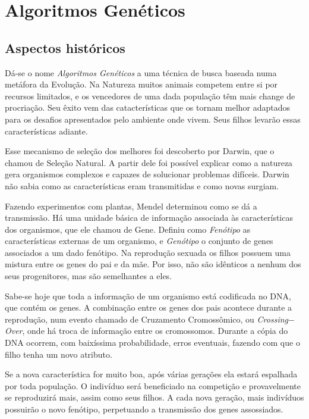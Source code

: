 \chapter{Algoritmos Genéticos\label{cap:ga}}

\section{Aspectos históricos}

Dá-se o nome \emph{Algoritmos Genéticos} a uma técnica de busca baseada numa metáfora da Evolução. Na Natureza muitos animais competem entre si por recursos limitados, e os vencedores de uma dada população têm mais change de procriação. Seu êxito vem das catacterísticas que os tornam melhor adaptados para os desafios apresentados pelo ambiente onde vivem. Seus filhos levarão essas características adiante. 

Esse mecanismo de seleção dos melhores foi descoberto por Darwin, que o chamou de Seleção Natural. A partir dele foi possível explicar como a natureza gera organismos complexos e capazes de solucionar problemas difíceis. Darwin não sabia como as características eram transmitidas e como novas surgiam.

Fazendo experimentos com plantas, Mendel determinou como se dá a transmissão. Há uma unidade básica de informação associada às características dos organismos, que ele chamou de Gene. Definiu como \emph{Fenótipo} as características externas de um organismo, e \emph{Genótipo} o conjunto de genes associados a um dado fenótipo. Na reprodução sexuada os filhos possuem uma mistura entre os genes do pai e da mãe. Por isso, não são idênticos a nenhum dos seus progenitores, mas são semelhantes a eles.

Sabe-se hoje que toda a informação de um organismo está codificada no DNA, que contém os genes. A combinação entre os genes dos pais acontece durante a reprodução, num evento chamado de Cruzamento Cromossômico, ou \emph{Crossing$-$Over}, onde há troca de informação entre os cromossomos. Durante a cópia do DNA ocorrem, com baixíssima probabilidade, erros eventuais, fazendo com que o filho tenha um novo atributo. 

Se a nova característica for muito boa, após várias gerações ela estará espalhada por toda população. O indivíduo será beneficiado na competição e provavelmente se reproduzirá mais, assim como seus filhos. A cada nova geração, mais indivíduos possuirão o novo fenótipo, perpetuando a transmissão dos genes assossiados. 

